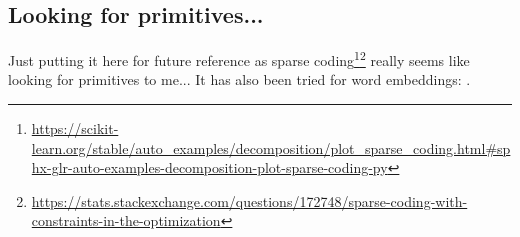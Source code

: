 \documentclass[utf8]{article}
\begin{document}
\subsection{Looking for primitives...}
Just putting it here for future reference as sparse coding\footnote{\url{https://scikit-learn.org/stable/auto_examples/decomposition/plot_sparse_coding.html#sphx-glr-auto-examples-decomposition-plot-sparse-coding-py}}\footnote{\url{https://stats.stackexchange.com/questions/172748/sparse-coding-with-constraints-in-the-optimization}} really seems like
looking for primitives to me...
It has also been tried for word embeddings: \citep{faruquietal2015,berend2017}.



\end{document}
